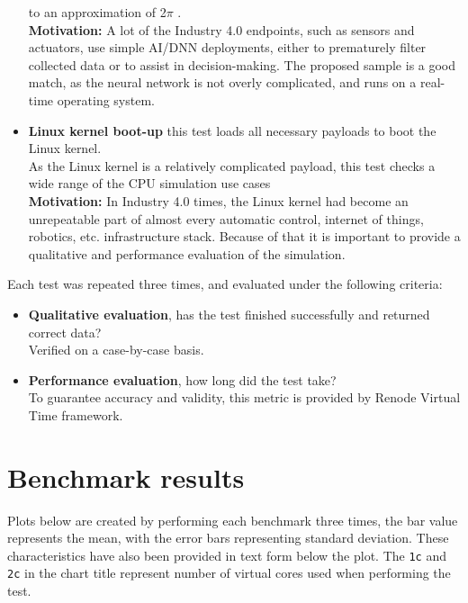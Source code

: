\begin{itemize}
{    to an approximation of 2$\pi$ \cite{ZephyrTF}.\\
    \textbf{Motivation:} A lot of the Industry 4.0 endpoints, such as sensors and actuators, use simple AI/DNN
    deployments, either to prematurely filter collected data or to assist in decision-making. The proposed sample
    is a good match, as the neural network is not overly complicated, and runs on a real-time operating system.}
    \item{\textbf{Linux kernel boot-up} this test loads all necessary payloads to boot the Linux kernel.\\
    As the Linux kernel is a relatively complicated payload, this test checks a wide range of the CPU simulation use
    cases\\
    \textbf{Motivation:} In Industry 4.0 times, the Linux kernel had become an unrepeatable part of almost every
    automatic control, internet of things, robotics, etc. infrastructure stack. Because of that it is important to
    provide a qualitative and performance evaluation of the simulation.}
\end{itemize}

\noindent
Each test was repeated three times, and evaluated under the following criteria:
\begin{itemize}
    \item{\textbf{Qualitative evaluation}, has the test finished successfully and returned correct data?\\
    Verified on a case-by-case basis.}
    \item{\textbf{Performance evaluation}, how long did the test take?\\To guarantee accuracy and validity, this metric is
     provided by Renode Virtual Time framework.}
\end{itemize}

\pagebreak

\section{Benchmark results}

Plots below are created by performing each benchmark three times, the bar value represents the mean, with the error bars
representing standard deviation. These characteristics have also been provided in text form below the plot. The
\texttt{1c} and \texttt{2c} in the chart title represent number of virtual cores used when performing the test.

